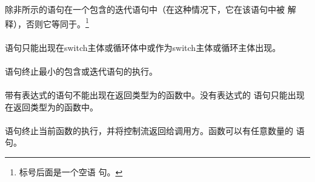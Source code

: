 \begin{minipage}{0.30\linewidth}
\mbox{\hspace{0em}}                                    \\
  \mbox{\hspace{2em}}                                           \\
  \mbox{\hspace{2em}}                                           \\
  \mbox{\hspace{2em}}                                           \\
\mbox{\hspace{0em}}                                               \\
\mbox{\hspace{0em}\tm{\}}}
\end{minipage}                                                              \\\\
除非所示的语句在一个包含的迭代语句中（在这种情况下，它在该语句中被
解释），否则它等同于。\footnote{标号后面是一个空语
句。}

\constraint
\paragraph{}
语句只能出现在switch主体或循环体中或作为switch主体或循环主体出现。

\semantic
\paragraph{}
语句终止最小的包含或迭代语句的执行。

\constraint
\paragraph{}
带有表达式的语句不能出现在返回类型为的函数中。没有表达式的
语句只能出现在返回类型为的函数中。

\semantic
\paragraph{}
语句终止当前函数的执行，并将控制流返回给调用方。函数可以有任意数量的
语句。

